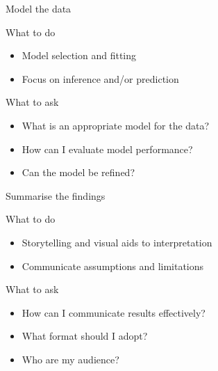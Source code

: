 \begin{frame}[t]{Model the data}
    \begin{block}{What to do}
        \begin{itemize}
            \item Model selection and fitting
            \item Focus on inference and/or prediction
        \end{itemize}
    \end{block}
    \vfill
    \begin{block}{What to ask}
        \begin{itemize}
            \item What is an appropriate model for the data?
            \item How can I evaluate model performance?
            \item Can the model be refined?
        \end{itemize}
    \end{block}
\end{frame}

\begin{frame}[t]{Summarise the findings}
    \begin{block}{What to do}
        \begin{itemize}
            \item Storytelling and visual aids to interpretation
            \item Communicate assumptions and limitations
        \end{itemize}
    \end{block}
    \vfill
    \begin{block}{What to ask}
        \begin{itemize}
            \item How can I communicate results effectively?
            \item What format should I adopt?
            \item Who are my audience?
        \end{itemize}
    \end{block}
\end{frame}

